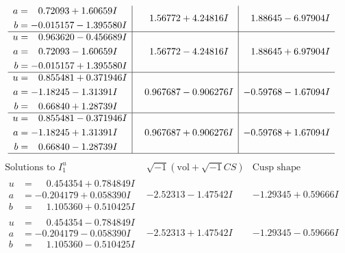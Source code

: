 \documentclass[1p]{elsarticle_modified}
\theoremstyle{definition}
\newcommand{\I}{\sqrt{-1}}
\begin{document}
$$\begin{array}{c|c|c}
\begin{aligned}
a &= \phantom{-}0.72093 + 1.60659 I \\
b &= -0.015157 - 1.395580 I\end{aligned}
 & \phantom{-}1.56772 + 4.24816 I & \phantom{-}1.88645 - 6.97904 I \\ \hline\begin{aligned}
u &= \phantom{-}0.963620 - 0.456689 I \\
a &= \phantom{-}0.72093 - 1.60659 I \\
b &= -0.015157 + 1.395580 I\end{aligned}
 & \phantom{-}1.56772 - 4.24816 I & \phantom{-}1.88645 + 6.97904 I \\ \hline\begin{aligned}
u &= \phantom{-}0.855481 + 0.371946 I \\
a &= -1.18245 - 1.31391 I \\
b &= \phantom{-}0.66840 + 1.28739 I\end{aligned}
 & \phantom{-}0.967687 - 0.906276 I & -0.59768 - 1.67094 I \\ \hline\begin{aligned}
u &= \phantom{-}0.855481 - 0.371946 I \\
a &= -1.18245 + 1.31391 I \\
b &= \phantom{-}0.66840 - 1.28739 I\end{aligned}
 & \phantom{-}0.967687 + 0.906276 I & -0.59768 + 1.67094 I\\
 \hline 
 \end{array}$$\newpage$$\begin{array}{c|c|c}  
\text{Solutions to }I^u_{1}& \I (\text{vol} + \sqrt{-1}CS) & \text{Cusp shape}\\
 \hline 
\begin{aligned}
u &= \phantom{-}0.454354 + 0.784849 I \\
a &= -0.204179 + 0.058390 I \\
b &= \phantom{-}1.105360 + 0.510425 I\end{aligned}
 & -2.52313 - 1.47542 I & -1.29345 + 0.59666 I \\ \hline\begin{aligned}
u &= \phantom{-}0.454354 - 0.784849 I \\
a &= -0.204179 - 0.058390 I \\
b &= \phantom{-}1.105360 - 0.510425 I\end{aligned}
 & -2.52313 + 1.47542 I & -1.29345 - 0.59666 I \\ \hline\begin{aligned}

\end{aligned}
\end{array}$$
\end{document}

